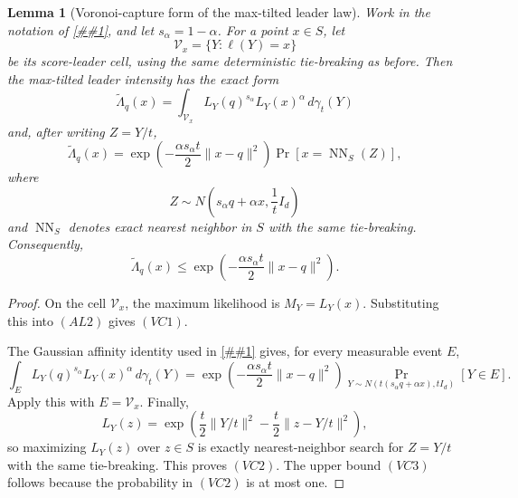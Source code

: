 \documentclass[10pt]{article}
\newcommand{\cref}[1]{\ref{##1}}
\newtheorem{lemma}[theorem]{Lemma}
\theoremstyle{definition}
\begin{document}
\begin{lemma}[Voronoi-capture form of the max-tilted leader law]
   \label{lem:alpha-leader-voronoi-capture}
   Work in the notation of \cref{lem:scale-amplified-alpha-leader}, and let
   \(s_\alpha=1-\alpha\).  For a point \(x\in S\), let
   \[
      \mathcal V_x
      =
      \{Y:\ell(Y)=x\}
   \]
   be its score-leader cell, using the same deterministic tie-breaking as
   before.  Then the max-tilted leader intensity has the exact form
   \[
      \widetilde\Lambda_q(x)
      =
      \int_{\mathcal V_x}
      L_Y(q)^{s_\alpha}L_Y(x)^\alpha\,d\gamma_t(Y)
      \tag{VC1}
   \]
   and, after writing \(Z=Y/t\),
   \[
      \widetilde\Lambda_q(x)
      =
      \exp\!\left(
         -\frac{\alpha s_\alpha t}{2}\|x-q\|^2
      \right)
      \Pr\!\left[
         x=\operatorname{NN}_S(Z)
      \right],
      \tag{VC2}
   \]
   where
   \[
      Z\sim
      N\!\left(s_\alpha q+\alpha x,\frac1t I_d\right)
   \]
   and \(\operatorname{NN}_S\) denotes exact nearest neighbor in \(S\) with the
   same tie-breaking.  Consequently,
   \[
      \widetilde\Lambda_q(x)
      \le
      \exp\!\left(
         -\frac{\alpha s_\alpha t}{2}\|x-q\|^2
      \right).
      \tag{VC3}
   \]
\end{lemma}

\begin{proof}
   On the cell \(\mathcal V_x\), the maximum likelihood is \(M_Y=L_Y(x)\).
   Substituting this into \((AL2)\) gives \((VC1)\).

   The Gaussian affinity identity used in
   \cref{thm:continuous-likelihood-balls} gives, for every measurable event
   \(E\),
   \[
      \int_E L_Y(q)^{s_\alpha}L_Y(x)^\alpha\,d\gamma_t(Y)
      =
      \exp\!\left(
         -\frac{\alpha s_\alpha t}{2}\|x-q\|^2
      \right)
      \Pr_{Y\sim N(t(s_\alpha q+\alpha x),tI_d)}[Y\in E].
   \]
   Apply this with \(E=\mathcal V_x\).  Finally,
   \[
      L_Y(z)
      =
      \exp\!\left(
         \frac{t}{2}\|Y/t\|^2
         -\frac{t}{2}\|z-Y/t\|^2
      \right),
   \]
   so maximizing \(L_Y(z)\) over \(z\in S\) is exactly nearest-neighbor
   search for \(Z=Y/t\) with the same tie-breaking.  This proves \((VC2)\).
   The upper bound \((VC3)\) follows because the probability in \((VC2)\) is
   at most one.
\end{proof}
\end{document}
